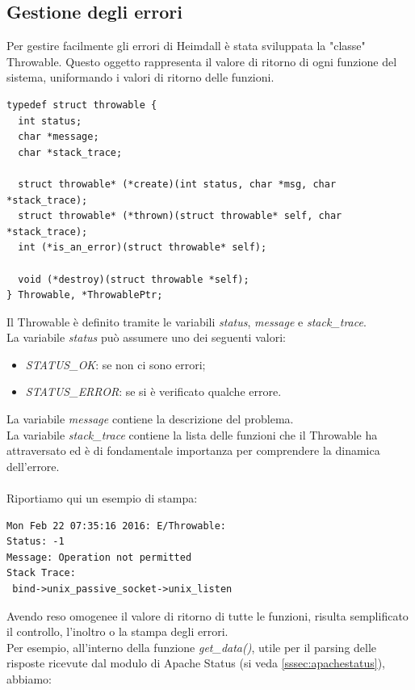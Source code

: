 \documentclass[italian]{tktltiki2}
\begin{document}
\subsection{Gestione degli errori}
\label{sec:errors}
Per gestire facilmente gli errori di Heimdall è stata sviluppata la "classe" Throwable.
Questo oggetto rappresenta il valore di ritorno di ogni funzione del sistema, uniformando i valori di ritorno delle funzioni.
\begin{lstlisting}
typedef struct throwable {
  int status;
  char *message;
  char *stack_trace;

  struct throwable* (*create)(int status, char *msg, char *stack_trace);
  struct throwable* (*thrown)(struct throwable* self, char *stack_trace);
  int (*is_an_error)(struct throwable* self);
  
  void (*destroy)(struct throwable *self);
} Throwable, *ThrowablePtr;
\end{lstlisting} 
Il Throwable è definito tramite le variabili \emph{status}, \emph{message} e \emph{stack\_trace}.
\\
La variabile \emph{status} può assumere uno dei seguenti valori:
\begin{itemize}
  \item \emph{STATUS\_OK}: se non ci sono errori;
  \item \emph{STATUS\_ERROR}: se si è verificato qualche errore.
\end{itemize}
La variabile \emph{message} contiene la descrizione del problema.
\\
La variabile \emph{stack\_trace} contiene la lista delle funzioni che il Throwable ha attraversato ed è di fondamentale importanza per comprendere la dinamica dell'errore.
\\\\
Riportiamo qui un esempio di stampa:
\begin{lstlisting}
Mon Feb 22 07:35:16 2016: E/Throwable: 
Status: -1 
Message: Operation not permitted 
Stack Trace: 
 bind->unix_passive_socket->unix_listen
\end{lstlisting}
Avendo reso omogenee il valore di ritorno di tutte le funzioni, risulta semplificato il controllo, l'inoltro o la stampa degli errori.
\\
Per esempio, all'interno della funzione \emph{get\_data()}, utile per il parsing delle risposte ricevute dal modulo di Apache Status (si veda \ref{sssec:apachestatus}), abbiamo:
\end{document}
